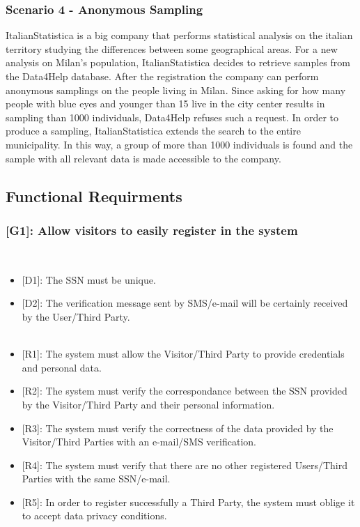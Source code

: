 \documentclass[12pt,a4paper]{article}
\begin{document}
	
	\subsubsection*{Scenario 4 - Anonymous Sampling}
	ItalianStatistica is a big company that performs statistical analysis on the italian territory studying the differences between some geographical areas. For a new analysis on Milan's population, ItalianStatistica decides to retrieve samples from the Data4Help database. After the registration the company can perform anonymous samplings on the people living in Milan. Since asking for how many people with blue eyes and younger than 15 live in the city center results in sampling than 1000 individuals, Data4Help refuses such a request. In order to produce a sampling, ItalianStatistica extends the search to the entire municipality. In this way, a group of more than 1000 individuals is found and the sample with all relevant data is made accessible to the company.
	
	\newpage
	
	\subsection{Functional Requirments}
	
	\subsubsection*{{[}{G1}{]}: Allow visitors to easily register in the system}
	\begin{itemize}\\
		\begin{itemize}
			\item {[D1]}: The SSN must be unique.
			\item {[D2]}: The verification message sent by SMS/e-mail will be certainly received by the User/Third Party.
			\\\\
			\item {[R1]}: The system must allow the Visitor/Third Party to provide credentials and personal data.
			\item {[R2]}: The system must verify the correspondance between the SSN provided by the Visitor/Third Party and their personal information.
			\item {[R3]}: The system must verify the correctness of the data provided by the Visitor/Third Parties with an e-mail/SMS verification.
			\item {[R4]}: The system must verify that there are no other registered Users/Third Parties with the same SSN/e-mail.
			\item {[R5]}: In order to register successfully a Third Party, the system must oblige it to accept data privacy conditions.
		\end{itemize} 
	\end{itemize}
\end{document}
